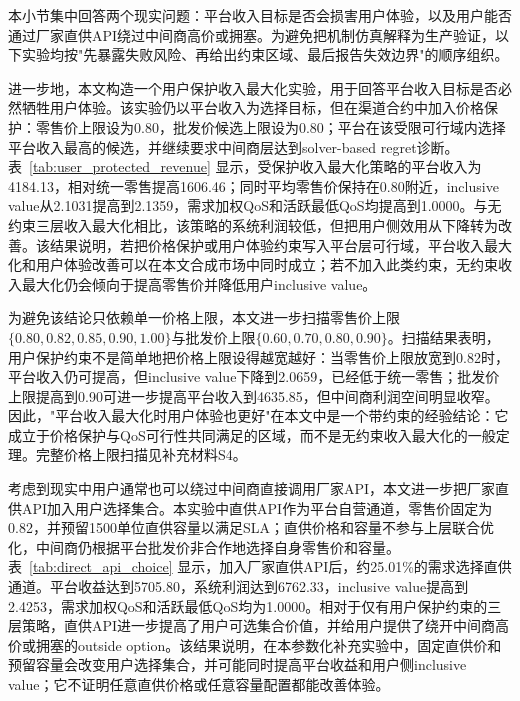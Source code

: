 \documentclass[UTF8,11pt]{ctexart}
\begin{document}
本小节集中回答两个现实问题：平台收入目标是否会损害用户体验，以及用户能否通过厂家直供API绕过中间商高价或拥塞。为避免把机制仿真解释为生产验证，以下实验均按"先暴露失败风险、再给出约束区域、最后报告失效边界"的顺序组织。

进一步地，本文构造一个用户保护收入最大化实验，用于回答平台收入目标是否必然牺牲用户体验。该实验仍以平台收入为选择目标，但在渠道合约中加入价格保护：零售价上限设为0.80，批发价候选上限设为0.80；平台在该受限可行域内选择平台收入最高的候选，并继续要求中间商层达到solver-based regret诊断。表~\ref{tab:user_protected_revenue} 显示，受保护收入最大化策略的平台收入为4184.13，相对统一零售提高1606.46；同时平均零售价保持在0.80附近，inclusive value从2.1031提高到2.1359，需求加权QoS和活跃最低QoS均提高到1.0000。与无约束三层收入最大化相比，该策略的系统利润较低，但把用户侧效用从下降转为改善。该结果说明，若把价格保护或用户体验约束写入平台层可行域，平台收入最大化和用户体验改善可以在本文合成市场中同时成立；若不加入此类约束，无约束收入最大化仍会倾向于提高零售价并降低用户inclusive value。

\begin{table}[H]
\centering
\caption{用户保护约束下的平台收入最大化}
\label{tab:user_protected_revenue}
\small
{}
\end{table}

为避免该结论只依赖单一价格上限，本文进一步扫描零售价上限$\{0.80,0.82,0.85,0.90,1.00\}$与批发价上限$\{0.60,0.70,0.80,0.90\}$。扫描结果表明，用户保护约束不是简单地把价格上限设得越宽越好：当零售价上限放宽到0.82时，平台收入仍可提高，但inclusive value下降到2.0659，已经低于统一零售；批发价上限提高到0.90可进一步提高平台收入到4635.85，但中间商利润空间明显收窄。因此，"平台收入最大化时用户体验也更好"在本文中是一个带约束的经验结论：它成立于价格保护与QoS可行性共同满足的区域，而不是无约束收入最大化的一般定理。完整价格上限扫描见补充材料S4。

考虑到现实中用户通常也可以绕过中间商直接调用厂家API，本文进一步把厂家直供API加入用户选择集合。本实验中直供API作为平台自营通道，零售价固定为0.82，并预留1500单位直供容量以满足SLA；直供价格和容量不参与上层联合优化，中间商仍根据平台批发价非合作地选择自身零售价和容量。表~\ref{tab:direct_api_choice} 显示，加入厂家直供API后，约25.01\%的需求选择直供通道。平台收益达到5705.80，系统利润达到6762.33，inclusive value提高到2.4253，需求加权QoS和活跃最低QoS均为1.0000。相对于仅有用户保护约束的三层策略，直供API进一步提高了用户可选集合价值，并给用户提供了绕开中间商高价或拥塞的outside option。该结果说明，在本参数化补充实验中，固定直供价和预留容量会改变用户选择集合，并可能同时提高平台收益和用户侧inclusive value；它不证明任意直供价格或任意容量配置都能改善体验。
\end{document}
